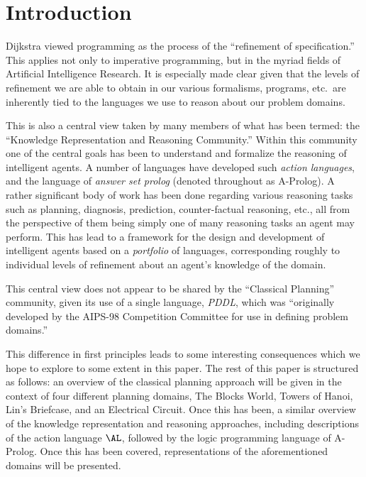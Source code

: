 \section{Introduction}

Dijkstra viewed programming as the process of the ``refinement of specification.'' This applies not only to imperative programming, but in the myriad fields of Artificial Intelligence Research. It is especially made clear given that the levels of refinement we are able to obtain in our various formalisms, programs, etc.\, are inherently tied to the languages we use to reason about our problem domains.

This is also a central view taken by many members of what has been termed: the ``Knowledge Representation and Reasoning Community.'' Within this community one of the central goals has been to understand and formalize the reasoning of intelligent agents. A number of languages have developed such \emph{action languages}, and the language of \emph{answer set prolog} (denoted throughout as A-Prolog). A rather significant body of work has been done regarding various reasoning tasks such as planning, diagnosis, prediction, counter-factual reasoning, etc., all from the perspective of them being simply one of many reasoning tasks an agent may perform. This has lead to a framework for the design and development of intelligent agents based on a \emph{portfolio} of languages, corresponding roughly to individual levels of refinement about an agent's knowledge of the domain.

This central view does not appear to be shared by the ``Classical Planning'' community, given its use of a single language, \emph{PDDL}, which was ``originally developed by the AIPS-98 Competition Committee for use in defining problem domains.''

This difference in first principles leads to some interesting consequences which we hope to explore to some extent in this paper. The rest of this paper is structured as follows: an overview of the classical planning approach will be given in the context of four different planning domains, The Blocks World, Towers of Hanoi, Lin's Briefcase, and an Electrical Circuit. Once this has been, a similar overview of the knowledge representation and reasoning approaches, including descriptions of the action language $\AL$, followed by the logic programming language of A-Prolog. Once this has been covered, representations of the aforementioned domains will be presented.
